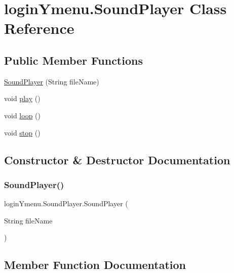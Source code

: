 \hypertarget{classlogin_ymenu_1_1_sound_player}{}\section{login\+Ymenu.\+Sound\+Player Class Reference}
\label{classlogin_ymenu_1_1_sound_player}
\subsection*{Public Member Functions}
\begin{DoxyCompactItemize}
\item 
\mbox{\hyperlink{classlogin_ymenu_1_1_sound_player_acc7030a3c7ab4b892d380cab2cea5cf2}{Sound\+Player}} (String file\+Name)
\item 
void \mbox{\hyperlink{classlogin_ymenu_1_1_sound_player_a5bc8659da139abc134dae848beac2310}{play}} ()
\item 
void \mbox{\hyperlink{classlogin_ymenu_1_1_sound_player_a5d1434b8918003b5770581d506dbd1d3}{loop}} ()
\item 
void \mbox{\hyperlink{classlogin_ymenu_1_1_sound_player_a700b4ad6ca0cef8a4598e7164a9c58ff}{stop}} ()
\end{DoxyCompactItemize}


\subsection{Constructor \& Destructor Documentation}
\mbox{\label{classlogin_ymenu_1_1_sound_player_acc7030a3c7ab4b892d380cab2cea5cf2}} 
\subsubsection{\texorpdfstring{Sound\+Player()}{SoundPlayer()}}
{\footnotesize\ttfamily login\+Ymenu.\+Sound\+Player.\+Sound\+Player (\begin{DoxyParamCaption}\item[{String}]{file\+Name }\end{DoxyParamCaption})}



\subsection{Member Function Documentation}
\mbox{\label{classlogin_ymenu_1_1_sound_player_a5d1434b8918003b5770581d506dbd1d3}} 

